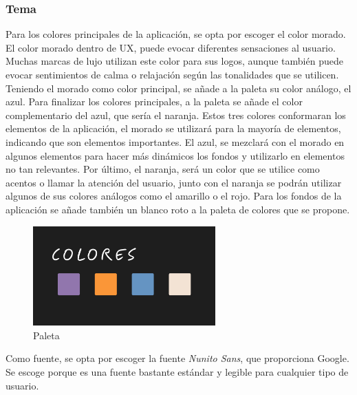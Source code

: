 \documentclass[a4paper, 12pt]{article}
\begin{document}
\subsubsection{Tema}

Para los colores principales de la aplicación, se opta por escoger el color morado. El color morado dentro de UX, puede evocar diferentes sensaciones al usuario. Muchas marcas de lujo utilizan este color para sus logos, aunque también puede evocar sentimientos de calma o relajación según las tonalidades que se utilicen. Teniendo el morado como color principal, se añade a la paleta su color análogo, el azul. Para finalizar los colores principales, a la paleta se añade el color complementario del azul, que sería el naranja. Estos tres colores conformaran los elementos de la aplicación, el morado se utilizará para la mayoría de elementos, indicando que son elementos importantes. El azul, se mezclará con el morado en algunos elementos para hacer más dinámicos los fondos y utilizarlo en elementos no tan relevantes. Por último, el naranja, será un color que se utilice como acentos o llamar la atención del usuario, junto con el naranja se podrán utilizar algunos de sus colores análogos como el amarillo o el rojo. Para los fondos de la aplicación se añade también un blanco roto a la paleta de colores que se propone.

\begin{figure}[H]
	\begin{center}
		{\includegraphics[width=7cm]{design/Colors.jpg}\par}
		\caption{Paleta}
	\end{center}
\end{figure}

Como fuente, se opta por escoger la fuente \textit{Nunito Sans}, que proporciona Google. Se escoge porque es una fuente bastante estándar y legible para cualquier tipo de usuario.
\end{document}
